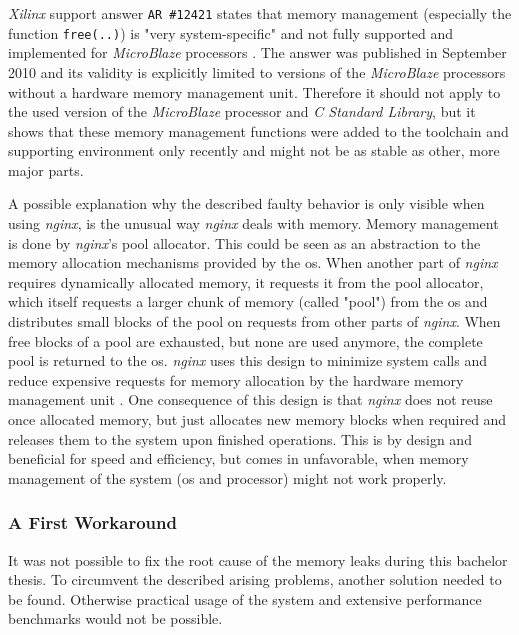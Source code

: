 \textit{Xilinx} support answer \texttt{AR \#12421} states that memory management (especially the function \texttt{free(..)}) is "very system-specific" and not fully supported and implemented for \textit{MicroBlaze} processors \cite{mbfree}. The answer was published in September 2010 and its validity is explicitly limited to versions of the \textit{MicroBlaze} processors without a hardware memory management unit. Therefore it should not apply to the used version of the \textit{MicroBlaze} processor and \textit{C Standard Library}, but it shows that these memory management functions were added to the toolchain and supporting environment only recently and might not be as stable as other, more major parts.

A possible explanation why the described faulty behavior is only visible when using \textit{nginx}, is the unusual way \textit{nginx} deals with memory. Memory management is done by \textit{nginx}'s pool allocator. This could be seen as an abstraction to the memory allocation mechanisms provided by the \gls{os}. When another part of \textit{nginx} requires dynamically allocated memory, it requests it from the pool allocator, which itself requests a larger chunk of memory (called "pool") from the \gls{os} and distributes small blocks of the pool on requests from other parts of \textit{nginx}. When free blocks of a pool are exhausted, but none are used anymore, the complete pool is returned to the \gls{os}. \textit{nginx} uses this design to minimize system calls and reduce expensive requests for memory allocation by the hardware memory management unit \cite{aosa}. One consequence of this design is that \textit{nginx} does not reuse once allocated memory, but just allocates new memory blocks when required and releases them to the system upon finished operations. This is by design and beneficial for speed and efficiency, but comes in unfavorable, when memory management of the system (\gls{os} and processor) might not work properly.
\\

\subsubsection{A First Workaround}

It was not possible to fix the root cause of the memory leaks during this bachelor thesis. To circumvent the described arising problems, another solution needed to be found. Otherwise practical usage of the system and extensive performance benchmarks would not be possible.


